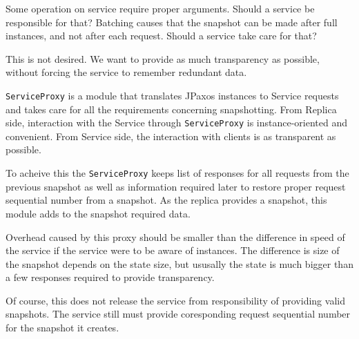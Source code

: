 Some operation on service require proper arguments. Should a service be responsible for that? Batching causes that the snapshot can be made after full instances, and not after each request. Should a service take care  for that?

This is not desired. We want to provide as much transparency as possible, without forcing the service to remember redundant data.

\texttt{ServiceProxy} is a module that translates JPaxos instances to Service requests and takes care for all the requirements concerning snapshotting. From Replica side, interaction with the Service through \texttt{ServiceProxy} is instance-oriented and convenient. From Service side, the interaction with clients is as transparent as possible.

To acheive this the \texttt{ServiceProxy} keeps list of responses for all requests from the previous snapshot as well as information required later to restore proper request sequential number from a snapshot.
As the replica provides a snapshot, this module adds to the snapshot required data.

Overhead caused by this proxy should be smaller than the difference in speed of the service if the service were to be aware of instances. The difference is size of the snapshot depends on the state size, but ususally the state is much bigger than a few responses required to provide transparency.

Of course, this does not release the service from responsibility of providing valid snapshots. The service still must provide coresponding request sequential number for the snapshot it creates.
